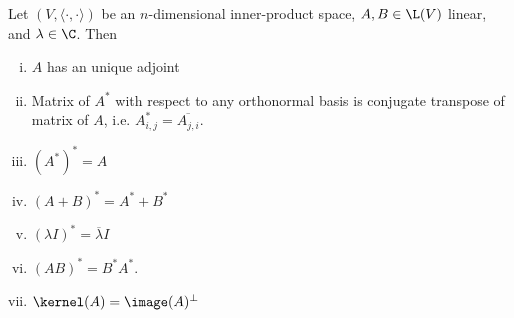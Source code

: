 \begin{lause}\label{basic_adjoint}
	Let $(V, \langle \cdot, \cdot \rangle)$ be an $n$-dimensional inner-product space, $A, B \in \L(V)$ linear, and $\lambda \in \C$. Then
	\begin{enumerate}[i)]
		\item $A$ has an unique adjoint
		\item Matrix of $A^{*}$ with respect to any orthonormal basis is conjugate transpose of matrix of $A$, i.e. $A^{*}_{i, j} = \overline{A_{j, i}}$.
		\item $(A^{*})^{*} = A$
		\item $(A + B)^{*} = A^{*} + B^{*}$
		\item $(\lambda I)^{*} = \overline{\lambda} I$
		\item $(AB)^{*} = B^{*}A^{*}$.
		\item $\kernel(A) = \image(A)^{\perp}$
	\end{enumerate}
\end{lause}
